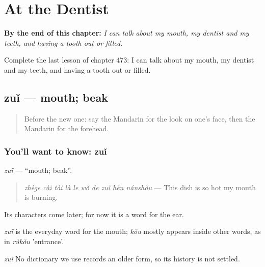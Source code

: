 
\chapter{At the Dentist}
\label{ch:zh-at-the-dentist}

\begin{chapteropening}
\textbf{By the end of this chapter:} \emph{I can talk about my mouth, my dentist and my teeth, and having a tooth out or filled.}

Complete the last lesson of chapter 473: I can talk about my mouth, my dentist and my teeth, and having a tooth out or filled.
\end{chapteropening}

\section[zuǐ]{zuǐ — mouth; beak}

\label{lesson:ZH-C473-zui}



\begin{quote}
Before the new one: say the Mandarin for the look on one's face, then the Mandarin for the forehead.
\end{quote}

\subsection*{You'll want to know: zuǐ}
\emph{zuǐ} — \textquotedblleft{}mouth; beak\textquotedblright{}.

\begin{quote}
\emph{zhège cài tài là le wǒ de zuǐ hěn nánshòu} — This dish is so hot my mouth is burning.
\end{quote}

Its characters come later; for now it is a word for the ear.

\emph{zuǐ} is the everyday word for the mouth;  \emph{kǒu} mostly appears inside other words, as in \emph{rùkǒu} 'entrance'.

\begin{cousinweb}
\emph{zuǐ} No dictionary we use records an older form, so its history is not settled.
\end{cousinweb}

